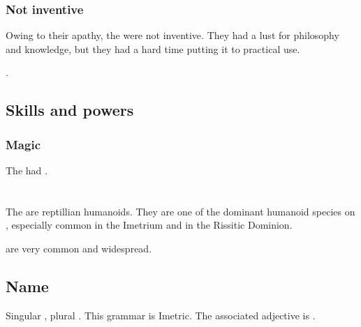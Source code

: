 \subsubsection{Not inventive}
Owing to their apathy, the \quiljaaran were not inventive. 
They had a lust for philosophy and knowledge, but they had a hard time putting it to practical use. 

. 









\subsection{Skills and powers}





\subsubsection{Magic}
The {\quiljaaran} had . 
















\section[Scatha]{\Scatha}
The \scathae{} are reptillian humanoids. They are one of the dominant humanoid species on \Miith{}, especially common in the Imetrium and in the Rissitic Dominion. 

\Scathae{} are very common and widespread. %









\subsection{Name}
Singular \emph{\scatha{}}, plural \emph{\scathae{}}. 
This grammar is Imetric. 
The associated adjective is \emph{\scathaese{}}. 

